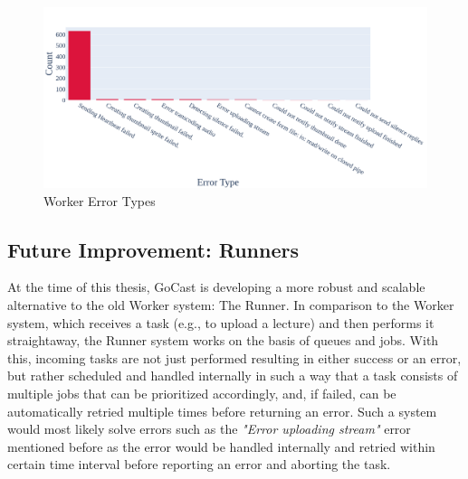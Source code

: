 \begin{figure}[htpb]
    \centering
    \includegraphics[width=\linewidth]{images/plots/worker/error_types.png}
    \caption[Worker Error Types]{Worker Error Types}\label{fig:worker-error-types}
\end{figure}

\subsection{Future Improvement: Runners}

At the time of this thesis, GoCast is developing a more robust and scalable alternative to the old Worker system: The Runner. In comparison to the Worker system, which receives a task (e.g., to upload a lecture) and then performs it straightaway, the Runner system works on the basis of queues and jobs. With this, incoming tasks are not just performed resulting in either success or an error, but rather scheduled and handled internally in such a way that a task consists of multiple jobs that can be prioritized accordingly, and, if failed, can be automatically retried multiple times before returning an error. Such a system would most likely solve errors such as the \textit{"Error uploading stream"} error mentioned before as the error would be handled internally and retried within certain time interval before reporting an error and aborting the task.



